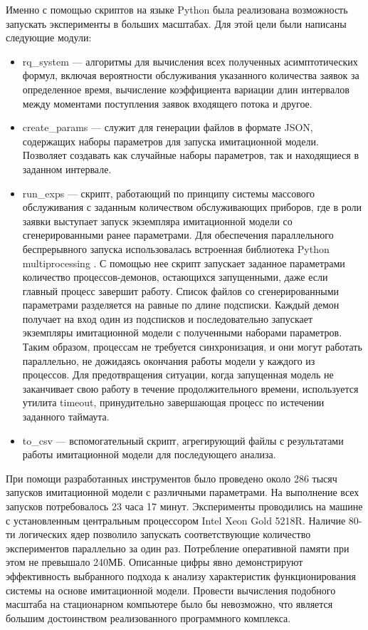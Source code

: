 Именно с помощью скриптов на языке Python была реализована возможность запускать эксперименты в больших масштабах. Для этой цели были написаны следующие модули:
\begin{itemize}
	\item rq\_system --- алгоритмы для вычисления всех полученных асимптотических формул, включая вероятности обслуживания указанного количества заявок за определенное время, вычисление коэффициента вариации длин интервалов между моментами поступления заявок входящего потока и другое.
	\item create\_params --- служит для генерации файлов в формате JSON, содержащих наборы параметров для запуска имитационной модели. Позволяет создавать как случайные наборы параметров, так и находящиеся в заданном интервале.
	\item run\_exps --- скрипт, работающий по принципу системы массового обслуживания с заданным количеством обслуживающих приборов, где в роли заявки выступает запуск экземпляра имитационной модели со сгенерированными ранее параметрами. Для обеспечения параллельного беспрерывного запуска использовалась встроенная библиотека Python multiprocessing \cite{hunt2019multiprocessing}. С помощью нее скрипт запускает заданное параметрами количество процессов-демонов, остающихся запущенными, даже если главный процесс завершит работу. Список файлов со сгенерированными параметрами разделяется на равные по длине подсписки. Каждый демон получает на вход один из подсписков и последовательно запускает экземпляры имитационной модели с полученными наборами параметров. Таким образом, процессам не требуется синхронизация, и они могут работать параллельно, не дожидаясь окончания работы модели у каждого из процессов. Для предотвращения ситуации, когда запущенная модель не заканчивает свою работу в течение продолжительного времени, используется утилита timeout, принудительно завершающая процесс по истечении заданного таймаута.
	\item to\_csv --- вспомогательный скрипт, агрегирующий файлы с результатами работы имитационной модели для последующего анализа.
\end{itemize}

При помощи разработанных инструментов было проведено около 286 тысяч запусков имитационной модели с различными параметрами. На выполнение всех запусков потребовалось 23 часа 17 минут. Эксперименты проводились на машине с установленным центральным процессором Intel Xeon Gold 5218R. Наличие 80-ти логических ядер позволило запускать соответствующие количество экспериментов параллельно за один раз. Потребление оперативной памяти при этом не превышало 240МБ. Описанные цифры явно демонстрируют эффективность выбранного подхода к анализу характеристик функционирования системы на основе имитационной модели. Провести вычисления подобного масштаба на стационарном компьютере было бы невозможно, что является большим достоинством реализованного программного комплекса.
\clearpage